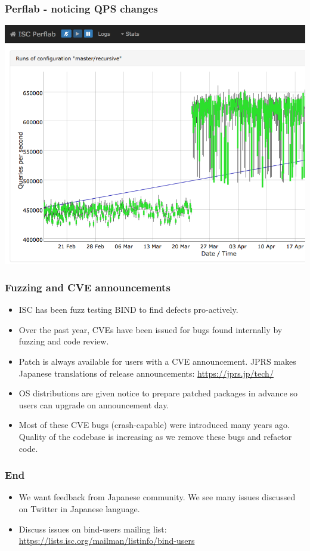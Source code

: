 \documentclass[aspectratio=169,14pt]{beamer}
\begin{document}
\frame
{
  \frametitle{Perflab - noticing QPS changes}

  \begin{center}
    \includegraphics[scale=0.3]{perf3.png}
  \end{center}
}

\frame
{
  \frametitle{Fuzzing and CVE announcements}

  \begin{itemize}

  \item ISC has been fuzz testing BIND to find defects pro-actively.

  \item Over the past year, CVEs have been issued for bugs found
    internally by fuzzing and code review.

  \item Patch is always available for users with a CVE
    announcement. JPRS makes Japanese translations of release
    announcements: \url{https://jprs.jp/tech/}

  \item OS distributions are given notice to prepare patched packages in
    advance so users can upgrade on announcement day.

  \item Most of these CVE bugs (crash-capable) were introduced many
    years ago. Quality of the codebase is increasing as we remove these
    bugs and refactor code.

  \end{itemize}

}

\frame
{
  \frametitle{End}

  \begin{itemize}

  \item We want feedback from Japanese community. We see many issues
    discussed on Twitter in Japanese language.

  \item Discuss issues on bind-users mailing list:
    \url{https://lists.isc.org/mailman/listinfo/bind-users}

  \end{itemize}

}
\end{document}

